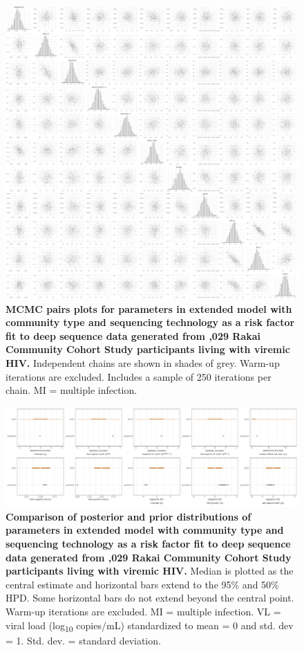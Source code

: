 \documentclass[10pt,letterpaper]{article}
\begin{document}
\begin{figure}[!ht]
 \includegraphics[width=1\textwidth]{../../figures/empirical_commtype_pairs.pdf}
\caption{{\bf MCMC pairs plots for parameters in extended model with community type and sequencing technology as a risk factor fit to deep sequence data generated from ,029 Rakai Community Cohort Study participants living with viremic HIV.} Independent chains are shown in shades of grey. Warm-up iterations are excluded. Includes a sample of 250 iterations per chain. MI = multiple infection. }
\end{figure}

\begin{figure}[!ht]
 \includegraphics[width=1\textwidth]{../../figures/empirical_commtype_prior.pdf}
\caption{{\bf Comparison of posterior and prior distributions of parameters in extended model with community type and sequencing technology as a risk factor fit to deep sequence data generated from ,029 Rakai Community Cohort Study participants living with viremic HIV.} Median is plotted as the central estimate and horizontal bars extend to the 95\% and 50\% HPD. Some horizontal bars do not extend beyond the central point. Warm-up iterations are excluded. MI = multiple infection. VL = viral load (log\textsubscript{10} copies/mL) standardized to mean = 0 and std. dev = 1. Std. dev. = standard deviation. }
\end{figure}
\end{document}
